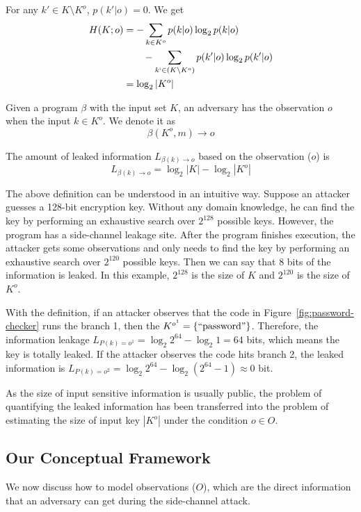 For any $k' \in K \setminus K^o$, $p(k'|o) = 0$. We get
\begin{align*}
    H(K;o) & = - \sum_{k {\in} K^o}{p(k|o)\log_2p(k|o)}                         \\
           & \qquad   - \sum_{k` {\in} (K \setminus K^o)}{p(k'|o)\log_2p(k'|o)} \\
           & = \log_2{|K^o|}
\end{align*}

\begin{mydef}
    \label{def}
    Given a program $\beta$ with the input set $K$,
    an adversary has the observation $o$ when the input $k{\in}K^o$.
    We denote it as
    $$\beta(K^o, m) \rightarrow	o$$

    The amount of leaked information $L_{\beta(k)\rightarrow o}$ based on the observation ($o$) is
    $$L_{\beta(k)\rightarrow o} = \log_2{|K|} - \log_2{|K^o|}$$
\end{mydef}
\vspace*{-5pt}

The above definition can be understood in an intuitive way. Suppose an attacker
guesses a 128-bit encryption key. 
Without any domain knowledge, 
he can find the key by performing an exhaustive search over $2^{128}$ possible keys. 
However, the program has a side-channel leakage site. After the program finishes execution, the
attacker gets some observations and only needs to find the key by performing an
exhaustive search over $2^{120}$ possible keys. Then we can say that 8 bits of the information
is leaked. In this example, $2^{128}$ is the size of $K$ and $2^{120}$ is the size of $K^o$.

With the definition, if an attacker observes that the code in
Figure~\ref{fig:password-checker} runs the branch 1, then the $K^{o^{1}} =
\{\mathrm{``password"}\}$. Therefore, the information leakage $L_{P(k)=o^{1}} =
\log_2{2^{64}} - \log_2{1} = 64$ bits, which means the key is totally leaked. If
the attacker observes the code hits branch 2, the leaked information is
$L_{P(k)=o^{2}} = \log_2{2^{64}} - \log_2{(2^{64}-1)} \approx 0$ bit.

As the size of input sensitive information is
usually public, the problem of quantifying the leaked information has been
transferred into the problem of estimating the size of input key $|K^o|$ under
the condition $o \in O$. 

\subsection{Our Conceptual Framework}
\label{side-channel:condition}
We now discuss how to model observations ($O$), which are the direct information
that an adversary can get during the side-channel attack.

